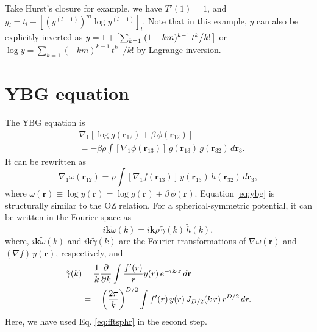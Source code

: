 \documentclass[aip,jcp,preprint,superscriptaddress,showpacs,preprintnumbers,amsmath,amssymb]{revtex4-1}
\numberwithin{equation}{section}
\newcommand{\vct}[1]{\mathbf{#1}}
\providecommand{\vr}{} %
\renewcommand{\vr}{\vct{r}}
\newcommand{\vk}{\vct{k}}
\begin{document}
Take Hurst's closure
%
%
for example,
we have $T'(1) = 1$,
and
$y_l = t_l - \left[ (y^{(l-1)})^m \log y^{(l-1)} \right]_l$.
%
Note that in this example,
$y$ can also be explicitly inverted as
$y =
1 +
\left[
  \sum_{k = 1} \left. (1 - k m)^{k-1} \, t^k \middle/ k! \right.
\right]$
or
$\log y =
\sum_{k = 1} \left. (-k m)^{k-1} \, t^k \middle./ k! \right.$
by Lagrange inversion\cite{whittaker, uhlenbeck1962}.





\section{YBG equation}





The YBG equation\cite{
yvon1935, *born1946, *nijboer1952, hill, *rice1965, hansen}
is
%
\begin{align*}
&
\nabla_1
  \left[
    \log g(\vr_{12})
    +
    \beta \, \phi(\vr_{12})
  \right]
\\
&
=
-\beta \rho \int
  [ \nabla_1 \phi(\vr_{13}) ] \,
  g(\vr_{13}) \, g(\vr_{32}) \, d\vr_3.
\end{align*}
%
It can be rewritten as
%
\begin{equation}
\nabla_1 \omega(\vr_{12})
=
\rho \int
  [ \nabla_1 f(\vr_{13}) ] \,
  y(\vr_{13}) \, h(\vr_{32}) \, d\vr_3,
\label{eq:ybg}
\end{equation}
%
where
$\omega(\vr) \equiv \log y(\vr) = \log g(\vr) + \beta \, \phi(\vr)$.
%
Equation \eqref{eq:ybg} is structurally similar to the OZ relation.
%
For a spherical-symmetric potential,
it can be written in the Fourier space as
%
\begin{equation}
i \vk \tilde \omega(k)
=
i \vk \rho \, \tilde \gamma(k) \, \tilde h(k),
\label{eq:ybg_omegak1}
\end{equation}
%
where,
$i \vk \tilde \omega(k)$
and
$i \vk \tilde \gamma(k)$
are the Fourier transformations of
$\nabla \omega (\vr)$
and
$(\nabla f) \, y(\vr)$,
respectively, and
%
%
%
\begin{align}
\tilde \gamma(k)
&=
\frac{ 1 } { k }
\frac{ \partial } { \partial k }
\int
  \frac{ f'(r) } { r }
  y(r) \, e^{-i \vk \cdot \vr} \, d\vr
\notag \\
&=
-\left( \frac{ 2 \pi } { k } \right)^{D/2}
  \int f'(r) \, y(r) \, J_{D/2}(k \, r) \, r^{D/2} \, dr.
\label{eq:ybg_gammak1}
\end{align}
%
%
%
Here, we have used Eq. \eqref{eq:fftsphr} in the second step.
\end{document}
